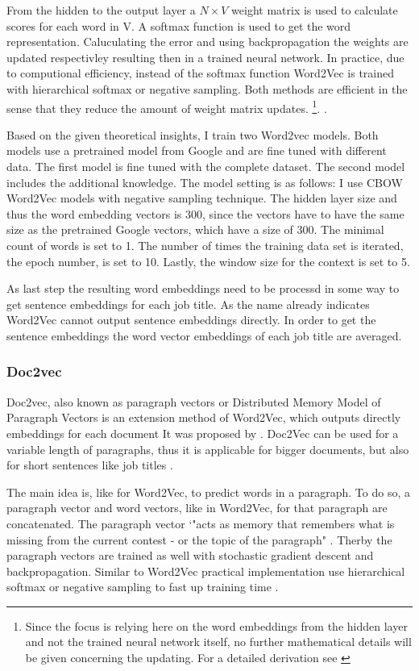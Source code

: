 \documentclass[12pt, a4paper, titlepage]{article}
\begin{document}
From the hidden to the output layer a $N \times V$ weight matrix is used to calculate scores for each word in V. A softmax function is used to get the word representation. Caluculating the error and using backpropagation the weights are updated respectivley resulting then in a trained neural network. In practice, due to computional efficiency, instead of the softmax function Word2Vec is trained with hierarchical softmax or negative sampling. Both methods are efficient in the sense that they reduce the amount of weight matrix updates. \footnote{Since the focus is relying here on the word embeddings from the hidden layer and not the trained neural network itself, no further mathematical details will be given concerning the updating. For a detailed derivation see \citep{rong2014}}. \citep{rong2014, simonton2017}. 

Based on the given theoretical insights, I train two Word2vec models. Both models use a pretrained model from Google and are fine tuned with different data. The first model is fine tuned with the complete dataset. The second model includes the additional knowledge. The model setting is as follows: I use \ac{CBOW} Word2Vec models with negative sampling technique. The hidden layer size and thus the word embedding vectors is 300, since the vectors have to have the same size as the pretrained Google vectors, which have a size of 300. The minimal count of words is set to 1. The number of times the training data set is iterated, the epoch number, is set to 10. Lastly, the window size for the context is set to 5. 

As last step the resulting word embeddings need to be processd in some way to get sentence embeddings for each job title. As the name already indicates Word2Vec cannot output sentence embeddings directly. In order to get the sentence embeddings the word vector embeddings of each job title are averaged. 

\subsubsection*{Doc2vec}
Doc2vec, also known as paragraph vectors or Distributed Memory Model of Paragraph Vectors is an extension method of Word2Vec, which outputs directly embeddings for each document \citep{lau2016} It was proposed by \cite{le2014}. Doc2Vec can be used for a variable length of paragraphs, thus it is applicable for bigger documents, but also for short sentences like job titles \citep{le2014}. 

The main idea is, like for Word2Vec, to predict words in a paragraph. To do so, a paragraph vector and word vectors, like in Word2Vec, for that paragraph are concatenated. The paragraph vector `"acts as memory that remembers what is missing from the current contest - or the topic of the paragraph" \citep[3]{le2014}. Therby the paragraph vectors are trained as well with stochastic gradient descent and backpropagation. Similar to Word2Vec practical implementation use hierarchical softmax or negative sampling to fast up training time \citep{lau2016}. 
\end{document}
